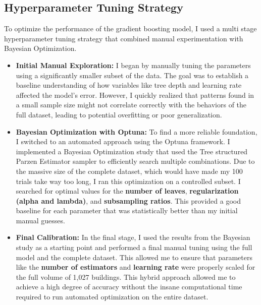 \documentclass[conference]{IEEEtran}
\begin{document}
\subsection{Hyperparameter Tuning Strategy}
To optimize the performance of the gradient boosting model, I used a multi stage hyperparameter tuning strategy that combined manual experimentation with Bayesian Optimization.
\begin{itemize} 
\item \textbf{Initial Manual Exploration:} I began by manually tuning the parameters using a significantly smaller subset of the data. The goal was to establish a baseline understanding of how variables like tree depth and learning rate affected the model's error. However, I quickly realized that patterns found in a small sample size might not correlate correctly with the behaviors of the full dataset, leading to potential overfitting or poor generalization. 
\item \textbf{Bayesian Optimization with Optuna:} To find a more reliable foundation, I switched to an automated approach using the Optuna framework. I implemented a Bayesian Optimization study that used the Tree structured Parzen Estimator sampler to efficiently search multiple combinations. Due to the massive size of the complete dataset, which would have made my 100 trials take way too long, I ran this optimization on a controlled subset. I searched for optimal values for the \textbf{number of leaves}, \textbf{regularization (alpha and lambda)}, and \textbf{subsampling ratios}. This provided a good baseline for each parameter that was statistically better than my initial manual guesses. 
\item \textbf{Final Calibration:} In the final stage, I used the results from the Bayesian study as a starting point and performed a final manual tuning using the full model and the complete dataset. This allowed me to ensure that parameters like the \textbf{number of estimators} and \textbf{learning rate} were properly scaled for the full volume of 1,027 buildings. This hybrid approach allowed me to achieve a high degree of accuracy without the insane computational time required to run automated optimization on the entire dataset. 
\end{itemize}
\end{document}
